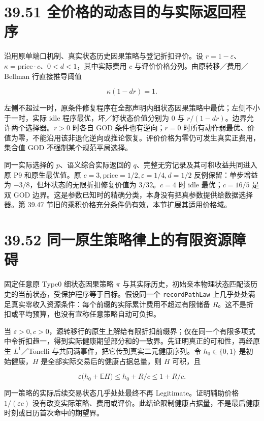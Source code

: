 \documentclass[
  11pt,
  oneside]{book}
\begin{document}
\section{39.51 全价格的动态目的与实际返回程序}\label{ux5168ux4ef7ux683cux7684ux52a8ux6001ux76eeux7684ux4e0eux5b9eux9645ux8fd4ux56deux7a0bux5e8f}

沿用原单端口机制、真实状态历史因果策略与登记折扣评价。设 \(r=1-\varepsilon\)、\(\kappa=\mathrm{price}\cdot c\)、\(0<d<1\)，其中实际费用 \(c\) 与评价价格分列。由原转移／费用／Bellman 行直接推导阈值

\[\kappa(1-dr)=1.\]

左侧不超过一时，原条件修复程序在全部声明内细状态因果策略中最优；左侧不小于一时，实际 idle 程序最优，坏／好状态价值分别为 \(0\) 与 \(r/(1-dr)\)。边界允许两个选择器。\(r>0\) 时各自 GOD 条件也有逆向；\(r=0\) 时所有动作弱最优、价值为零，不能沿用该非退化逆向或推论恢复。评价价格为零仍可发生真实正费用，集合值 GOD 不强制某个规范平局选择。

同一实际选择的 \(p\)、语义综合实际返回的 \(q\)、完整无穷记录及其可积收益共同进入原 P9 和原生最优值。原 \(c=3,\mathrm{price}=1/2,\varepsilon=1/4,d=1/2\) 反例保留：单步增益为 \(-3/8\)，但坏状态的无限折扣修复价值为 \(3/32\)。\(c=4\) 时 idle 最优；\(c=16/5\) 是双 GOD 边界。这是参数已知时的精确分类，本身没有把真参数提供给数据选择器。第 39.47 节旧的乘积价格充分条件仍有效，本节扩展其适用价格域。

\section{39.52 同一原生策略律上的有限资源障碍}\label{ux540cux4e00ux539fux751fux7b56ux7565ux5f8bux4e0aux7684ux6709ux9650ux8d44ux6e90ux969cux788d}

固定任意原 Type0 细状态因果策略 \(\pi\) 与其实际历史，初始亲本物理状态匹配该历史的当前状态，受保护程序等于目标。假设同一个 \nolinkurl{recordPathLaw} 上几乎处处满足真实零收入资源条件：每个前缀的实际累计费用不超过有限储备 \(R\)。这不是折扣或平均预算，也没有宣称任意策略自动可负担。

当 \(\varepsilon>0,c>0\)，源转移行的原生上解给有限折扣前缀界；仅在同一个有限多项式中令折扣趋一，得到实际健康期望部分和的一致界。先证明真正的可和性，再经原生 \(L^1\)／Tonelli 与共同满事件，把它传到真实二元健康序列。令 \(h_0\in\{0,1\}\) 是初始健康，\(H\) 是全部实际交易后的健康占据总量，则 \(H\) 可积，且

\[\varepsilon\bigl(h_0+\mathbb E H\bigr)
\le h_0+R/c\le 1+R/c.\]

同一策略的实际后续交易状态几乎处处最终不再 Legitimate。证明辅助价格 \(1/(\varepsilon c)\) 没有改变实际策略、费用或评价。此结论限制健康占据量，不是最后健康时刻或日历首次命中的期望界。
\end{document}

